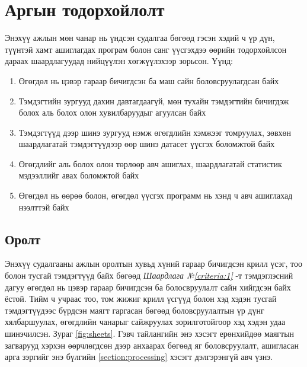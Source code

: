 \chapter{Аргын тодорхойлолт}

Энэхүү ажлын мөн чанар нь үндсэн судалгаа бөгөөд гэсэн хэдий ч үр дүн, түүнтэй хамт ашиглагдах програм болон санг үүсгэхдээ өөрийн тодорхойлсон дараах шаардлагуудад нийцүүлэн хөгжүүлэхээр зорьсон. Үүнд:

\begin{enumerate}
	\item Өгөгдөл нь цэвэр гараар бичигдсэн ба маш сайн боловсруулагдсан байх \label{criteria:1}
	\item Тэмдэгтийн зургууд дахин давтагдаагүй, мөн тухайн тэмдэгтийн бичигдэж болох аль болох олон хувилбаруудыг агуулсан байх \label{criteria:2}
	\item Тэмдэгтүүд дээр шинэ зургууд нэмж өгөгдлийн хэмжээг томруулах, зөвхөн шаардлагатай тэмдэгтүүдээр өөр шинэ датасет үүсгэх боломжтой байх \label{criteria:3}
	\item Өгөгдлийг аль болох олон төрлөөр авч ашиглах, шаардлагатай статистик мэдээллийг авах боломжтой байх \label{criteria:4}
	\item Өгөгдөл нь өөрөө болон, өгөгдөл үүсгэх программ нь хэнд ч авч ашиглахад нээлттэй байх \label{criteria:5}
\end{enumerate}

\section{Оролт}

Энэхүү судалгааны ажлын оролтын хувьд хүний гараар бичигдсэн крилл үсэг, тоо болон тусгай тэмдэгтүүд байх бөгөөд \textit{Шаардлага №\ref{criteria:1}} -т тэмдэглэсний дагуу өгөгдөл нь цэвэр гараар бичигдсэн ба болосвруулалт сайн хийгдсэн байх ёстой. Тийм ч учраас тоо, том жижиг крилл үсгүүд болон хэд хэдэн тусгай тэмдэгтүүдээс бүрдсэн маягт гаргасан бөгөөд боловсруулалтын үр дүнг хялбаршуулах, өгөгдлийн чанарыг сайжруулах зорилготойгоор хэд хэдэн удаа шинэчилсэн. Зураг \ref{fig:sheets}.
Гэвч тайлангийн энэ хэсэгт ерөнхийдөө маягтын загварууд хэрхэн өөрчлөгдсөн дээр анхаарах бөгөөд яг боловсруулалт, ашигласан арга зэргийг энэ бүлгийн \ref{section:processing} хэсэгт дэлгэрэнгүй авч үзнэ.


